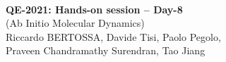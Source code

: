 \documentclass[landscape]{foils}
\begin{document}

\blue
~\\
\vspace*{4cm}
\MyLogo{~}
\vspace{5em}
\begin{center}
  {\burgundy\LARGE\bf QE-2021: Hands-on session -- Day-8}\\[2em]
  {\burgundy\LARGE (Ab Initio Molecular Dynamics)}
  ~\\[1.5em]
  \large Riccardo BERTOSSA, Davide Tisi, Paolo Pegolo,\\
Praveen Chandramathy Surendran, Tao Jiang
\end{center}
\end{document}
